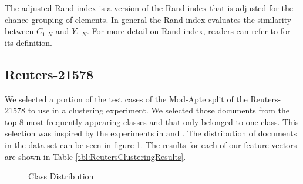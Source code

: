 \documentclass[11pt]{article}
\begin{document}
The adjusted Rand index is a version of the Rand index that is adjusted for the chance grouping of elements. In general the Rand index evaluates the similarity between $C_{1:N}$ and $Y_{1:N}$. For more detail on Rand index, readers can refer to \cite{Yeung2001} for its definition.

\subsection{Reuters-21578}

We selected a portion of the test cases of the Mod-Apte split of the Reuters-21578 to use in a clustering experiment. We selected those documents from the top 8 most frequently appearing classes and that only belonged to one class. This selection was inspired by the experiments in \cite{Nastase2007} and \cite{Hofmann2000}. The distribution of documents in the data set can be seen in figure \ref{fig:ReutersClassDist}. The results for each of our feature vectors are shown in Table \ref{tbl:ReutersClusteringResults}. 

\begin{figure}[H]
\centering
{}
  \caption{Class Distribution}
  \label{fig:ReutersClassDist}

\end{figure}
\end{document}

